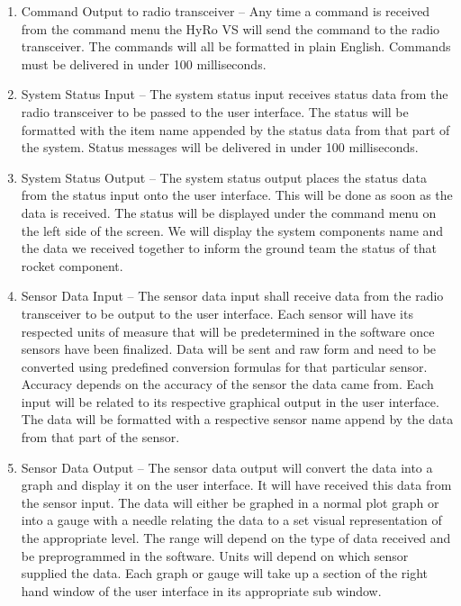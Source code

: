 \documentclass[10pt,draftclsnofoot,onecolumn,compsoc]{IEEEtran}
\begin{document}
\begin{enumerate}
\item Command Output to radio transceiver –
	Any time a command is received from the command menu the HyRo VS will send the command to the radio transceiver. The commands will all be formatted in plain English. Commands must be delivered in under 100 milliseconds.
\item System Status Input –
	The system status input receives status data from the radio transceiver to be passed to the user interface. The status will be formatted with the item name appended by the status data from that part of the system. Status messages will be delivered in under 100 milliseconds. 
\item System Status Output –
The system status output places the status data from the status input onto the user interface. This will be done as soon as the data is received. The status will be displayed under the command menu on the left side of the screen. We will display the system components name and the data we received together to inform the ground team the status of that rocket component.
\item Sensor Data Input –
The sensor data input shall receive data from the radio transceiver to be output to the user interface. Each sensor will have its respected units of measure that will be predetermined in the software once sensors have been finalized. Data will be sent and raw form and need to be converted using predefined conversion formulas for that particular sensor. Accuracy depends on the accuracy of the sensor the data came from. Each input will be related to its respective graphical output in the user interface. The data will be formatted with a respective sensor name append by the data from that part of the sensor.
\item Sensor Data Output –
The sensor data output will convert the data into a graph and display it on the user interface. It will have received this data from the sensor input. The data will either be graphed in a normal plot graph or into a gauge with a needle relating the data to a set visual representation of the appropriate level. The range will depend on the type of data received and be preprogrammed in the software. Units will depend on which sensor supplied the data. Each graph or gauge will take up a section of the right hand window of the user interface in its appropriate sub window. 
\end{enumerate}
\end{document}
